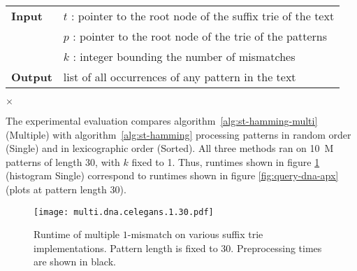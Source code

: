 \begin{figure*}[t]
\begin{center}
\begin{minipage}[t]{.8\textwidth}
\begin{algorithm}[H]
\begin{tabular}{ll}
\textbf{Input}  & $t$ : pointer to the root node of the suffix trie of the text\\
 			    & $p$ : pointer to the root node of the trie of the patterns\\
 			    & $k$ : integer bounding the number of mismatches\\
\textbf{Output} & list of all occurrences of any pattern in the text\\
\end{tabular}
\begin{algorithmic}[1]
\Else
		\State \Report {} $\times$ 
		\Repeat
			\Repeat
				\State {}
	\EndIf
\EndIf
\end{algorithmic}
\label{alg:st-hamming-multi}
\end{algorithm}
\end{minipage}
\end{center}
\end{figure*}

The experimental evaluation compares algorithm~\ref{alg:st-hamming-multi} (Multiple) with algorithm~\ref{alg:st-hamming} processing patterns in random order (Single) and in lexicographic order (Sorted).
All three methods ran on 10~M patterns of length 30, with $k$ fixed to 1.
Thus, runtimes shown in figure \ref{fig:query-dna-apx-multi} (histogram Single) correspond to runtimes shown in figure \ref{fig:query-dna-apx} (plots at pattern length 30).

\begin{figure}[b]
\begin{center}
\caption[Multiple $k$-mismatches runtime]{Runtime of multiple $1$-mismatch on various suffix trie implementations. Pattern length is fixed to 30. Preprocessing times are shown in black.}
\label{fig:query-dna-apx-multi}
\texttt{[image: multi.dna.celegans.1.30.pdf]}
\end{center}
\end{figure}

